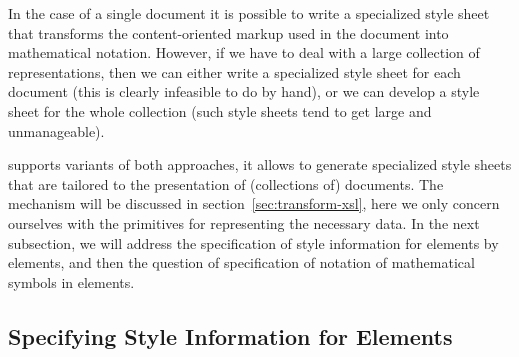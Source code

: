 In the case of a single {\omdoc} document it is possible to write a specialized
style sheet that transforms the content-oriented markup used in the document into
mathematical notation. However, if we have to deal with a large collection of
{\omdoc} representations, then we can either write a specialized style sheet for
each document (this is clearly infeasible to do by hand), or we can develop a
style sheet for the whole collection (such style sheets tend to get large and
unmanageable).

{\omdoc} supports variants of both approaches, it allows to generate specialized
style sheets that are tailored to the presentation of (collections of) {\omdoc}
documents. The mechanism will be discussed in section~\ref{sec:transform-xsl},
here we only concern ourselves with the {\omdoc} primitives for representing the
necessary data. In the next subsection, we will address the specification of style
information for {\omdoc} elements by {} elements, and then the
question of specification of notation of mathematical symbols in
{} elements.

\subsection{Specifying Style Information for {\else{\omdoc}\fi} Elements}

